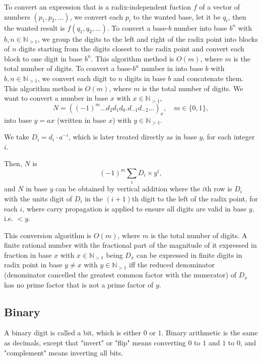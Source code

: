 \documentclass[a4paper,12pt]{report}
\begin{document}
\begin{itemizle}
To convert an expression that is a radix-independent fuction $f$ of a vector of numbers $(p_1,p_2,\ldots)$, we convert each $p_i$ to the wanted base, let it be $q_i$, then the wanted result is $f(q_1,q_2,\ldots)$.
To convert a base-$b$ number into base $b^n$ with $b,n\in\mathbb{N}_{>1}$, we group the digits to the left and right of the radix point into blocks of $n$ digits starting from the digits closest to the radix point and convert each block to one digit in base $b^n$. This algorithm method is $O(m)$, where $m$ is the total number of digits.
To convert a base-$b^n$ number in into base $b$ with $b,n\in\mathbb{N}_{>1}$, we convert each digit to $n$ digits in base $b$ and concatenate them. This algorithm method is $O(m)$, where $m$ is the total number of digits.
We want to convert a number in base $x$ with $x\in\mathbb{N}_{>1}$,
\[N=((-1)^m\ldots d_2d_1d_0.d_{-1}d_{-2}\ldots)_x,\quad m\in\{0,1\},\]
into base $y=ax$ (written in base $x$) with $y\in\mathbb{N}_{>1}$.

We take $D_i=d_i\cdot a^{-i}$, which is later treated directly as in base $y$, for each integer $i$.

Then, $N$ is
\[(-1)^m\sum_iD_i\times y^i,\]
and $N$ in base $y$ can be obtained by vertical addition where the $i$th row is $D_i$ with the units digit of $D_i$ in the $(i+1)$th digit to the left of the radix point, for each $i$, where carry propagation is applied to ensure all digits are valid in base $y$, i.e. $<y$.

This conversion algorithm is $O(m)$, where $m$ is the total number of digits.
A finite rational number with the fractional part of the magnitude of it expressed in fraction in base $x$ with $x\in\mathbb{N}_{>1}$ being $D_x$ can be expressed in finite digits in radix point in base $y\neq x$ with $y\in\mathbb{N}_{>1}$ iff the reduced denominator (denominator cancelled the greatest common factor with the numerator) of $D_x$ has no prime factor that is not a prime factor of $y$.
\subsection{Binary}
A binary digit is called a bit, which is either $0$ or $1$. Binary arithmetic is the same as decimals, except that "invert" or "flip" means converting $0$ to $1$ and $1$ to $0$, and "complement" means inverting all bits.


\end{itemizle}
\end{document}
